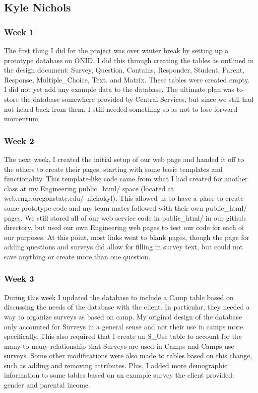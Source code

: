 \documentclass[letterpaper,10pt,serif, draftclsnofoot,onecolumn, compsoc, titlepage]{IEEEtran}
\begin{document}
\subsection{Kyle Nichols}
\subsubsection{Week 1}
The first thing I did for the project was over winter break by setting up a prototype database on ONID.
I did this through creating the tables as outlined in the design document: Survey, Question, Contains, Responder, Student, Parent, Response, Multiple\_Choice, Text, and Matrix.
These tables were created empty.
I did not yet add any example data to the database.
The ultimate plan was to store the database somewhere provided by Central Services, but since we still had not heard back from them, I still needed something so as not to lose forward momentum.
\subsubsection{Week 2}
The next week, I created the initial setup of our web page and handed it off to the others to create their pages, starting with some basic templates and functionality.
This template-like code came from what I had created for another class at my Engineering public\_html/ space (located at web.engr.oregonstate.edu/~nichokyl).
This allowed us to have a place to create some prototype code and my team mates followed with their own public\_html/ pages.
We still stored all of our web service code in public\_html/ in our github directory, but used our own Engineering web pages to test our code for each of our purposes.
At this point, most links went to blank pages, though the page for adding questions and surveys did allow for filling in survey text, but could not save anything or create more than one question.
\subsubsection{Week 3}
During this week I updated the database to include a Camp table based on discussing the needs of the database with the client.
In particular, they needed a way to organize surveys as based on camp.
My original design of the database only accounted for Surveys in a general sense and not their use in camps more specifically.
This also required that I create an S\_Use table to account for the many-to-many relationship that Surveys are used in Camps and Camps use surveys.
Some other modifications were also made to tables based on this change, such as adding and removing attributes.
Plus, I added more demographic information to some tables based on an example survey the client provided: gender and parental income.
\end{document}
